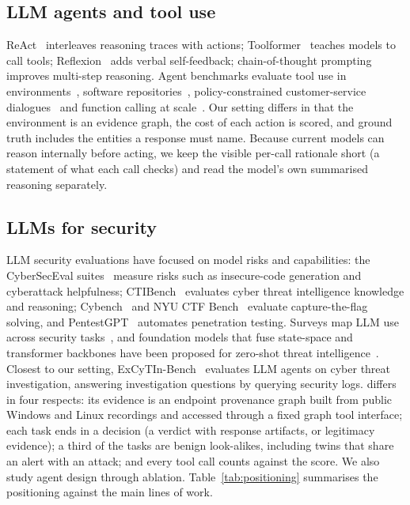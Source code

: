 \subsection{LLM agents and tool use}
ReAct~\cite{yao2023react} interleaves reasoning traces with actions; Toolformer~\cite{schick2023toolformer}
teaches models to call tools; Reflexion~\cite{shinn2023reflexion} adds verbal self-feedback; chain-of-thought
prompting~\cite{wei2022cot} improves multi-step reasoning. Agent benchmarks evaluate tool use in
environments~\cite{liu2024agentbench}, software repositories~\cite{jimenez2024swebench}, policy-constrained
customer-service dialogues~\cite{yao2025taubench} and function calling at scale~\cite{patil2025bfcl}. Our setting differs in that the environment is an
evidence graph, the cost of each action is scored, and ground truth includes the entities a response must
name. Because current models can reason internally before acting, we keep the visible per-call rationale
short (a statement of what each call checks) and read the model's own summarised reasoning separately.

\subsection{LLMs for security}
LLM security evaluations have focused on model risks and capabilities: the CyberSecEval
suites~\cite{bhatt2023cyberseceval,bhatt2024cyberseceval2,wan2024cyberseceval3} measure risks such as
insecure-code generation and cyberattack helpfulness; CTIBench~\cite{alam2024ctibench} evaluates
cyber threat intelligence knowledge and reasoning; Cybench~\cite{zhang2025cybench} and NYU CTF
Bench~\cite{shao2024nyuctf} evaluate capture-the-flag solving, and PentestGPT~\cite{deng2024pentestgpt}
automates penetration testing. Surveys map LLM use across security tasks~\cite{xu2025llm4security}, and foundation models that fuse
state-space and transformer backbones have been proposed for zero-shot threat intelligence~\cite{anaedevha2026cyberseclllm}.
Closest to our setting,
ExCyTIn-Bench~\cite{wu2026excytin} evaluates LLM agents on cyber threat investigation, answering
investigation questions by querying security logs. \bench differs in four respects: its evidence is an
endpoint provenance graph built from public Windows and Linux recordings and accessed through a fixed graph
tool interface; each task ends in a decision (a verdict with response artifacts, or legitimacy evidence);
a third of the tasks are benign look-alikes, including twins that share an alert with an attack; and every
tool call counts against the score. We also study agent design through ablation.
Table~\ref{tab:positioning} summarises the positioning against the main lines of work.

